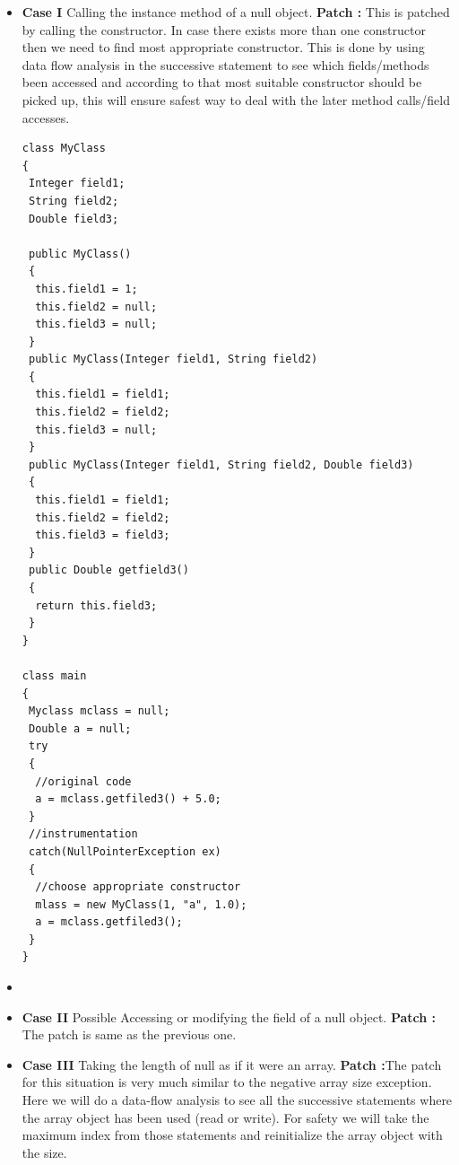 \begin{itemize}
  \item \textbf{Case I} Calling the instance method of a null object. \newline
  \textbf{Patch :} This is patched by calling the constructor. In case there
  exists more than one constructor then we need to find most appropriate
  constructor. This is done by using data flow analysis in the successive
  statement to see which fields/methods been accessed and according to that
  most suitable constructor should be picked up, this will ensure safest way to
  deal with the later method calls/field accesses.
  
  \lstset{language=Java, caption=appropriate constructor,
label=patchingexample2}

\begin{lstlisting}
class MyClass
{
 Integer field1;
 String field2;
 Double field3;

 public MyClass()
 {
  this.field1 = 1;
  this.field2 = null;
  this.field3 = null;
 } 
 public MyClass(Integer field1, String field2)
 {
  this.field1 = field1;
  this.field2 = field2;
  this.field3 = null;
 } 
 public MyClass(Integer field1, String field2, Double field3)
 {
  this.field1 = field1;
  this.field2 = field2;
  this.field3 = field3;
 }
 public Double getfield3()
 {
  return this.field3;
 }
}

class main
{
 Myclass mclass = null;
 Double a = null;
 try
 {
  //original code
  a = mclass.getfiled3() + 5.0;
 }
 //instrumentation
 catch(NullPointerException ex)
 {
  //choose appropriate constructor
  mlass = new MyClass(1, "a", 1.0); 
  a = mclass.getfiled3();
 }
}
\end{lstlisting}
  \item 
  
  \item \textbf{Case II} Possible Accessing or modifying the field of a null
  object.\newline
  \textbf{Patch :} The patch is same as the previous one.
  
  \item \textbf{Case III} Taking the length of null as if it were an
  array.\newline
  \textbf{Patch :}The patch for this situation is very much similar to the
  negative array size exception. Here we will do a data-flow analysis to see all
  the successive statements where the array object has been used (read or
  write). For safety we will take the maximum index from those statements and
  reinitialize the array object with the size.
    

\end{itemize}
